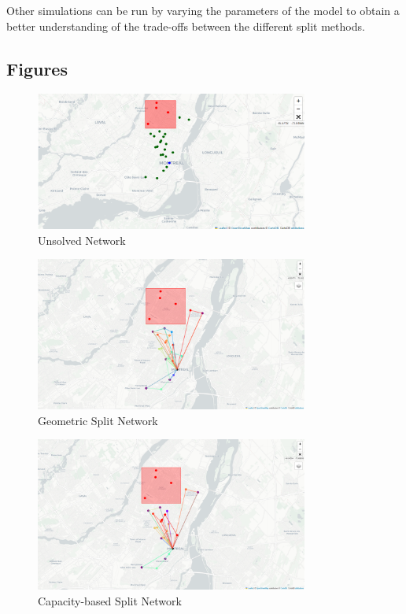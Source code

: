 \documentclass[12pt]{article}
\begin{document}
Other simulations can be run by varying the parameters of the model to obtain a better understanding of the trade-offs between the different split methods.

\newpage
\begin{appendices}
    \section{Figures}\label{app:figures}
    \begin{figure}[h]
        \centering
        \includegraphics[width=0.8\textwidth]{unsolved-network.png}
        \caption{Unsolved Network}
        \label{fig:unsolved-network}
    \end{figure}

    \begin{figure}[h]
        \centering
        \includegraphics[width=0.8\textwidth]{geometric-network.png}
        \caption{Geometric Split Network}
        \label{fig:geometric-network}
    \end{figure}

    \begin{figure}[h]
        \centering
        \includegraphics[width=0.8\textwidth]{capacity-network.png}
        \caption{Capacity-based Split Network}
        \label{fig:capacity-network}
    \end{figure}


\end{appendices}
\end{document}
